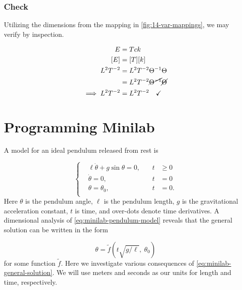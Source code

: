 \documentclass[12pt,twoside]{article}
\begin{document}
  \subsubsection*{Check}
  Utilizing the dimensions from the mapping in \cref{fig:14-var-mappings}, we
  may verify by inspection.

  \begin{equation*}
    \begin{aligned}
      E &= Tck \\
      [E] &= [T][k] \\
      L^2T^{-2} &= L^2T^{-2}\Theta^{-1} \Theta \\
       &= L^2T^{-2} \cancel{\Theta^{-1}} \cancel{\Theta} \\
      \implies L^2T^{-2} &= L^2T^{-2} \quad\checkmark \\
    \end{aligned}
  \end{equation*}

\section{Programming Minilab}
A model for an ideal pendulum released from rest is

\begin{equation}
  \label{eq:minilab-pendulum-model}
   \left\{
  \begin{aligned}
    &\ell\ddot{\theta}+g\sin\theta = 0, \quad &t &\ge0 \\
    &\dot{\theta} = 0, \quad &t &= 0 \\
    &\theta = \theta_0, \quad &t &= 0. \\
  \end{aligned}\right.
\end{equation}
Here $\theta$ is the pendulum angle, $\ell$ is the pendulum length, $g$ is the
gravitational acceleration constant, $t$ is time, and over-dots denote time
derivatives. A dimensional analysis of \cref{eq:minilab-pendulum-model} reveals
that the general solution can be written in the form

\begin{equation}
  \label{eq:minilab-general-solution}
  \theta = \tilde{f}(t\sqrt{g/\ell}, \;\theta_0)
\end{equation}
for some function $\tilde{f}$. Here we investigate various consequences of
\cref{eq:minilab-general-solution}. We will use meters and seconds as our units
for length and time, respectively.

\subsection{}
\label{sec:minilab-part-1}
\end{document}
